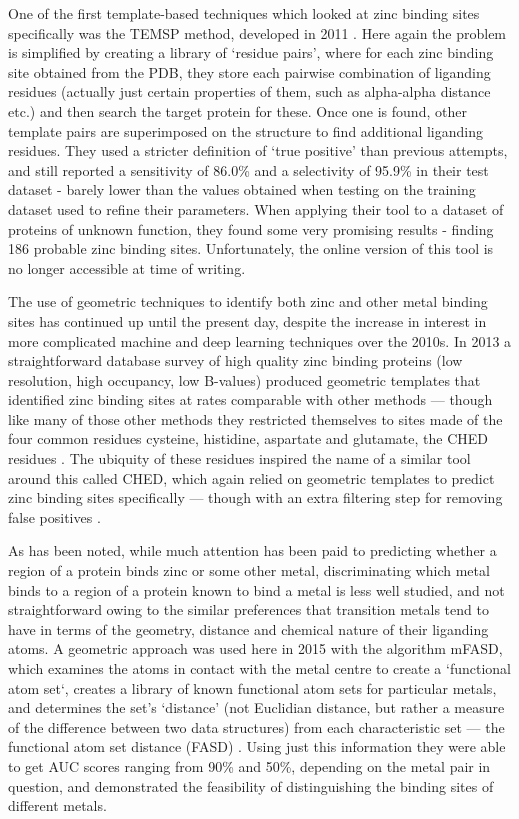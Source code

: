 One of the first template-based techniques which looked at zinc binding sites specifically was the TEMSP method, developed in 2011 \cite{zhao2011structure}. Here again the problem is simplified by creating a library of `residue pairs', where for each zinc binding site obtained from the PDB, they store each pairwise combination of liganding residues (actually just certain properties of them, such as alpha-alpha distance etc.) and then search the target protein for these. Once one is found, other template pairs are superimposed on the structure to find additional liganding residues. They used a stricter definition of `true positive' than previous attempts, and still reported a sensitivity of 86.0\% and a selectivity of 95.9\% in their test dataset - barely lower than the values obtained when testing on the training dataset used to refine their parameters. When applying their tool to a dataset of proteins of unknown function, they found some very promising results - finding 186 probable zinc binding sites. Unfortunately, the online version of this tool is no longer accessible at time of writing.

The use of geometric techniques to identify both zinc and other metal binding sites has continued up until the present day, despite the increase in interest in more complicated machine and deep learning techniques over the 2010s. In 2013 a straightforward database survey of high quality zinc binding proteins (low resolution, high occupancy, low B-values) produced geometric templates that identified zinc binding sites at rates comparable with other methods --- though like many of those other methods they restricted themselves to sites made of the four common residues cysteine, histidine, aspartate and glutamate, the CHED residues \cite{liu2014}. The ubiquity of these residues inspired the name of a similar tool around this called CHED, which again relied on geometric templates to predict zinc binding sites specifically --- though with an extra filtering step for removing false positives \cite{sobolev2013web}.

As has been noted, while much attention has been paid to predicting whether a region of a protein binds zinc or some other metal, discriminating which metal binds to a region of a protein known to bind a metal is less well studied, and not straightforward owing to the similar preferences that transition metals tend to have in terms of the geometry, distance and chemical nature of their liganding atoms. A geometric approach was used here in 2015 with the algorithm mFASD, which examines the atoms in contact with the metal centre to create a `functional atom set`, creates a library of known functional atom sets for particular metals, and determines the set's `distance' (not Euclidian distance, but rather a measure of the difference between two data structures) from each characteristic set --- the functional atom set distance (FASD) \cite{he2015}. Using just this information they were able to get AUC scores ranging from 90\% and 50\%, depending on the metal pair in question, and demonstrated the feasibility of distinguishing the binding sites of different metals. 

